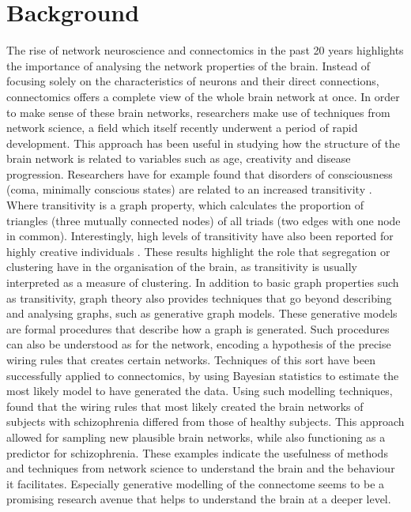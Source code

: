 \documentclass[11pt]{report} %
\begin{document}
\section{Background}
The rise of network neuroscience and connectomics in the past 20 years highlights the importance of analysing the network properties of the brain.
Instead of focusing solely on the characteristics of neurons and their direct connections, connectomics offers a complete view of the whole brain network at once. 
In order to make sense of these brain networks, researchers make use of techniques from network science, a field which itself recently underwent a period of rapid development.
This approach has been useful in studying how the structure of the brain network is related to variables such as age, creativity and disease progression. 
Researchers have for example found that disorders of consciousness (coma, minimally conscious states) are related to an increased transitivity \cite{tan2019}. Where transitivity is a graph property, which calculates the proportion of triangles (three mutually connected nodes) of all triads (two edges with one node in common).
Interestingly, high levels of transitivity have also been reported for highly creative individuals \cite{durante2018}.
These results highlight the role that segregation or clustering have in the organisation of the brain, as transitivity is usually interpreted as a measure of clustering.
In addition to basic graph properties such as transitivity, graph theory also provides techniques that go beyond describing and analysing graphs, such as generative graph models.
These generative models are formal procedures that describe how a graph is generated. Such procedures can also be understood as  for the network, encoding a hypothesis of the precise wiring rules that creates certain networks.
Techniques of this sort have been successfully applied to connectomics, by using Bayesian statistics to estimate the most likely model to have generated the data.
Using such modelling techniques, \cite{vertes2012} found that the wiring rules that most likely created the brain networks of subjects with schizophrenia differed from those of healthy subjects. This approach allowed for sampling new plausible brain networks, while also functioning as a predictor for schizophrenia.
These examples indicate the usefulness of methods and techniques from network science to understand the brain and the behaviour it facilitates. 
Especially generative modelling of the connectome seems to be a promising research avenue that helps to understand the brain at a deeper level.\\\\
\end{document}
